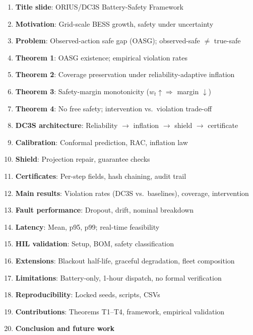 \begin{enumerate}
\item \textbf{Title slide}: ORIUS/DC3S Battery-Safety Framework
\item \textbf{Motivation}: Grid-scale BESS growth, safety under uncertainty
\item \textbf{Problem}: Observed-action safe gap (OASG); observed-safe $\neq$ true-safe
\item \textbf{Theorem 1}: OASG existence; empirical violation rates
\item \textbf{Theorem 2}: Coverage preservation under reliability-adaptive inflation
\item \textbf{Theorem 3}: Safety-margin monotonicity ($w_t \uparrow \Rightarrow$ margin $\downarrow$)
\item \textbf{Theorem 4}: No free safety; intervention vs.\ violation trade-off
\item \textbf{DC3S architecture}: Reliability $\rightarrow$ inflation $\rightarrow$ shield $\rightarrow$ certificate
\item \textbf{Calibration}: Conformal prediction, RAC, inflation law
\item \textbf{Shield}: Projection repair, guarantee checks
\item \textbf{Certificates}: Per-step fields, hash chaining, audit trail
\item \textbf{Main results}: Violation rates (DC3S vs.\ baselines), coverage, intervention
\item \textbf{Fault performance}: Dropout, drift, nominal breakdown
\item \textbf{Latency}: Mean, p95, p99; real-time feasibility
\item \textbf{HIL validation}: Setup, BOM, safety classification
\item \textbf{Extensions}: Blackout half-life, graceful degradation, fleet composition
\item \textbf{Limitations}: Battery-only, 1-hour dispatch, no formal verification
\item \textbf{Reproducibility}: Locked seeds, scripts, CSVs
\item \textbf{Contributions}: Theorems T1--T4, framework, empirical validation
\item \textbf{Conclusion and future work}
\end{enumerate}

